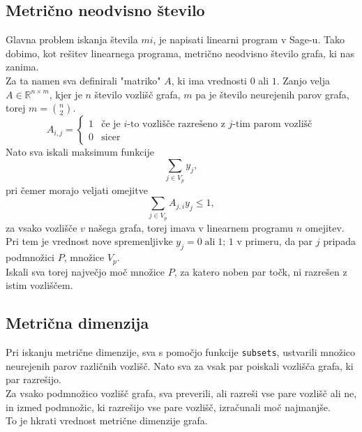 \documentclass[a4paper]{article}
\begin{document}
\subsection{Metrično neodvisno število}
Glavna problem iskanja števila $mi$, je napisati linearni program v Sage-u. Tako dobimo, kot rešitev linearnega programa, metrično neodvisno število grafa, ki nas zanima.\\
Za ta namen sva definirali "matriko" $A$, ki ima vrednosti $0$ ali $1$. Zanjo velja $A \in \mathbb{R}^{n \times m}$, kjer je $n$ število vozlišč grafa, $m$ pa je število neurejenih parov grafa, torej $m={n\choose2}$.
\begin{equation} 
  A_{i,j} =
    \begin{cases}
      1& \text{če je $i$-to vozlišče razrešeno z $j$-tim parom vozlišč}\\
      0& \text{sicer}
    \end{cases}       
\end{equation}
Nato sva iskali maksimum funkcije $$\sum_{j \in V_{p}} y_{j}, $$ pri čemer morajo veljati omejitve $$\sum_{j \in V_{p}} A_{j,i}y_{j} \leq 1,  $$ za vsako vozlišče $v$ našega grafa, torej imava v linearnem programu $n$ omejitev. Pri tem je vrednost nove spremenljivke $y_j=0\;
 \text{ali}\; 1$; $1$ v primeru, da par $j$ pripada podmnožici $P$, množice $V_p$.\\
 Iskali sva torej največjo moč množice $P$, za katero noben par točk, ni razrešen z istim vozliščem. 
 
\subsection{Metrična dimenzija}
Pri iskanju metrične dimenzije, sva s pomočjo funkcije \texttt{subsets}, ustvarili množico neurejenih parov različnih vozlišč. Nato sva za vsak par poiskali vozlišča grafa, ki par razrešijo.\\
Za vsako podmnožico vozlišč grafa, sva preverili, ali razreši vse pare vozlišč ali ne, in izmed podmnožic, ki razrešijo vse pare vozlišč, izračunali moč najmanjše.\\
To je hkrati vrednost metrične dimenzije grafa.
\end{document}
